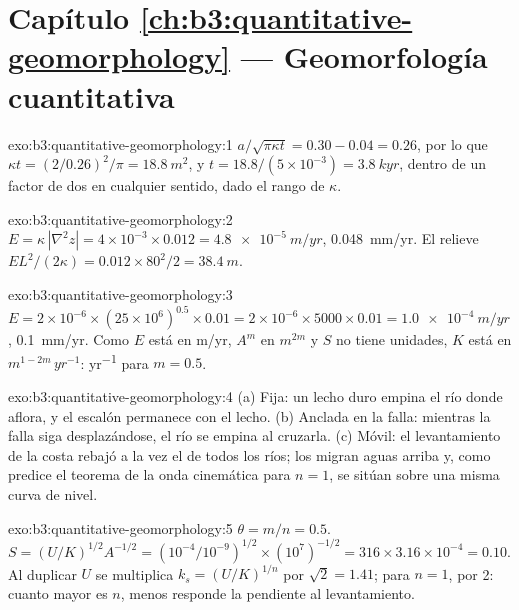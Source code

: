 \section*{Capítulo \ref{ch:b3:quantitative-geomorphology} --- Geomorfología cuantitativa}

\begin{solution}{exo:b3:quantitative-geomorphology:1}
$a/\sqrt{\pi\kappa t} = 0.30 - 0.04 = 0.26$, por lo que $\kappa t = (2/0.26)^2/\pi =
\qty{18.8}{m^2}$, y $t = 18.8/(5\times10^{-3}) = \qty{3.8}{kyr}$, dentro de un
factor de dos en cualquier sentido, dado el rango de $\kappa$.
\end{solution}

\begin{solution}{exo:b3:quantitative-geomorphology:2}
$E = \kappa\,|\nabla^2 z| = 4\times10^{-3}\times0.012 =
\qty{4.8e-5}{m/yr}$, \qty{0.048}{mm/yr}. El relieve $E L^2/(2\kappa) =
0.012\times80^2/2 = \qty{38.4}{m}$.
\end{solution}

\begin{solution}{exo:b3:quantitative-geomorphology:3}
$E = 2\times10^{-6}\times(25\times10^6)^{0.5}\times0.01 = 2\times10^{-6}
\times5000\times0.01 = \qty{1.0e-4}{m/yr}$, \qty{0.1}{mm/yr}. Como $E$ está
en \unit{m/yr}, $A^m$ en $\unit{m}^{2m}$ y $S$ no tiene unidades, $K$ está en
$\unit{m}^{1-2m}\,\unit{yr^{-1}}$: \unit{yr^{-1}} para $m = 0.5$.
\end{solution}

\begin{solution}{exo:b3:quantitative-geomorphology:4}
(a) Fija: un lecho duro empina el río donde aflora, y el escalón
permanece con el lecho. (b) Anclada en la falla: mientras la falla siga
desplazándose, el río se empina al cruzarla. (c) Móvil: el levantamiento de
la costa rebajó a la vez el  de todos los ríos; los  migran aguas arriba y, como predice el teorema de la onda cinemática para $n
= 1$, se sitúan sobre una misma curva de nivel.
\end{solution}

\begin{solution}{exo:b3:quantitative-geomorphology:5}
$\theta = m/n = 0.5$. $S = (U/K)^{1/2}A^{-1/2} = (10^{-4}/10^{-9})^{1/2}
\times(10^7)^{-1/2} = 316\times3.16\times10^{-4} = 0.10$. Al duplicar $U$
se multiplica $k_s = (U/K)^{1/n}$ por $\sqrt2 = 1.41$; para $n = 1$, por 2:
cuanto mayor es $n$, menos responde la pendiente al levantamiento.
\end{solution}

